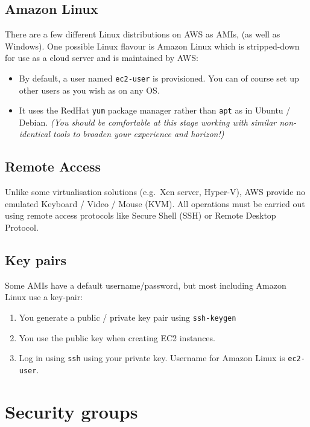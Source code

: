 \subsection{Amazon Linux}\label{amazon-linux}

There are a few different Linux distributions on AWS as AMIs, (as well as Windows).
One possible Linux flavour is Amazon Linux which is stripped-down for use as a cloud server and is maintained by AWS:

\begin{itemize}
\item
  By default, a user named \texttt{ec2-user} is provisioned. You can of
  course set up other users as you wish as on any OS.
\item
  It uses the RedHat \texttt{yum} package manager rather than
  \texttt{apt} as in Ubuntu / Debian. \emph{(You should be comfortable
  at this stage working with similar non-identical tools to broaden your
  experience and horizon!)}
\end{itemize}

\subsection{Remote Access}\label{remote-access}

Unlike some virtualisation solutions (e.g.~Xen server, Hyper-V), AWS provide no emulated Keyboard / Video / Mouse (KVM).
All operations must be carried out using remote access protocols like Secure Shell (SSH) or Remote Desktop Protocol.

\subsection{Key pairs}
\label{sec:key-pairs}

Some AMIs have a default username/password, but most including Amazon
Linux use a key-pair:

\begin{enumerate}
\item
  You generate a public / private key pair using \texttt{ssh-keygen}
\item
  You use the public key when creating EC2 instances.
\item
  Log in using \texttt{ssh} using your private key.
  Username for Amazon Linux is \texttt{ec2-user}.
\end{enumerate}


\section{Security groups}
\label{security-groups}

